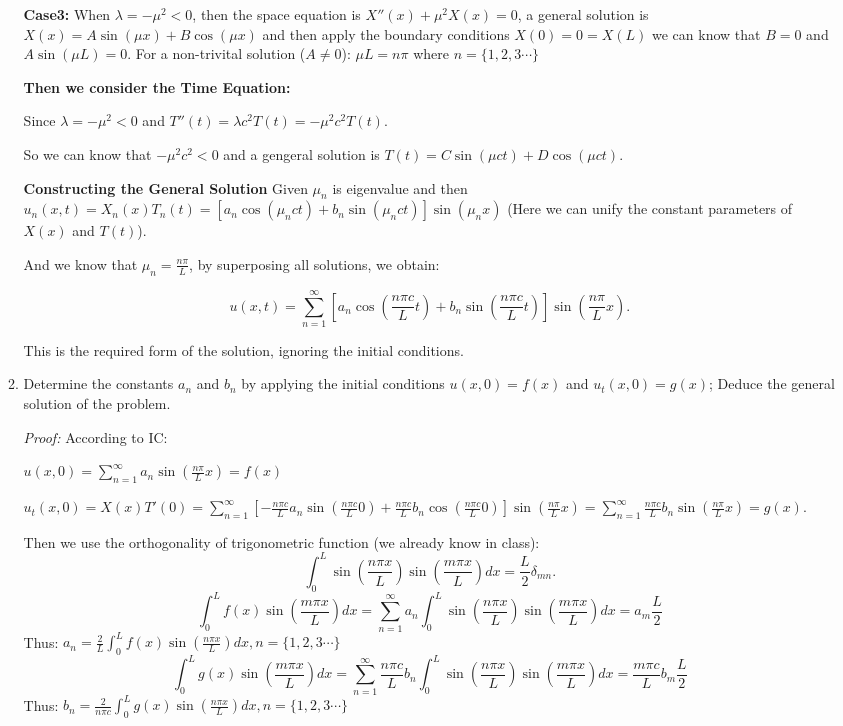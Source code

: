 \documentclass[letterpaper,12pt]{article}
\begin{document}
\begin{enumerate}[Q(1)]
\begin{enumerate}
\textbf{Case3:} When $\lambda=-\mu^2<0$, then the space equation is $X''(x)+\mu^2X(x)=0$, a general solution is $X(x)=A\sin(\mu x)+B\cos(\mu x)$ and then apply the boundary conditions $X(0)=0=X(L)$ we can know that $B=0$ and $A\sin(\mu L)=0$. For a non-trivital solution ($A\neq0$): $\mu L=n \pi$ where $n=\{1,2,3\cdots\}$

\textbf{Then we consider the Time Equation:}

Since $\lambda=-\mu^2<0$ and  $T''(t) =  \lambda c^2 T(t)=-\mu^2c^2T(t).$

So we can know that $-\mu^2 c^2<0$ and a gengeral solution is $T(t)=C\sin(\mu c t)+D\cos(\mu c t)$.

\textbf{Constructing the General Solution}
Given $\mu_n$ is eigenvalue and then $u_n(x,t)=X_n(x)T_n(t)=[a_n\cos(\mu_n ct)+b_n\sin(\mu_nct)]\sin(\mu_n x)$ (Here we can unify the constant parameters of $X(x)$ and $T(t)$).

And we know that $\mu_n = \frac{n\pi}{L}$, by superposing all solutions, we obtain:

\[
u(x,t) = \sum_{n=1}^{\infty} \left[ a_n \cos \left( \frac{n\pi c}{L} t \right) + b_n \sin \left( \frac{n\pi c}{L} t \right) \right] \sin \left( \frac{n\pi}{L} x \right).
\]

This is the required form of the solution, ignoring the initial conditions.




    \item Determine the constants \( a_n \) and \( b_n \) by applying the initial conditions \( u(x,0) = f(x) \) and \( u_t(x,0) = g(x) \); Deduce the general solution of the problem.
    
\textit{Proof:} According to IC:

$u(x,0)=\sum_{n=1}^{\infty} a_n\sin \left( \frac{n\pi}{L} x \right)=f(x)$

$u_t(x,0)=X(x)T'(0)=\sum_{n=1}^{\infty} \left[-\frac{n\pi c}{L} a_n \sin \left( \frac{n\pi c}{L} 0 \right) +\frac{n\pi c}{L} b_n \cos \left( \frac{n\pi c}{L} 0 \right) \right] \sin \left( \frac{n\pi}{L} x \right)=\sum_{n=1}^\infty \frac{n\pi c}{L}b_n \sin(\frac{n\pi}{L} x)=g(x)$.

Then we use the orthogonality of trigonometric function (we already know in class):
\[\int_0^L \sin(\frac{n\pi x}{L})\sin(\frac{m\pi x}{L})dx=\frac{L}{2} \delta_{mn}.\]
\[
\int_0^L f(x) \sin(\frac{m \pi x}{L})dx=\sum_{n=1}^\infty a_n \int_0^L \sin(\frac{n\pi x}{L})\sin(\frac{m\pi x}{L})dx=a_m \frac{L}{2}
\]
Thus: $a_n = \frac{2}{L}\int_0^L f(x) \sin(\frac{n\pi x}{L})dx, n=\{1,2,3\cdots\}$
\[
\int_0^L g(x) \sin(\frac{m \pi x}{L})dx=\sum_{n=1}^\infty \frac{n\pi c}{L}b_n \int_0^L \sin(\frac{n\pi x}{L})\sin(\frac{m\pi x}{L})dx=\frac{m\pi c}{L}b_m \frac{L}{2}
\]
Thus: $b_n = \frac{2}{n \pi c}\int_0^L g(x) \sin(\frac{n\pi x}{L})dx, n=\{1,2,3\cdots\}$


\end{enumerate}
\end{enumerate}
\end{document}
